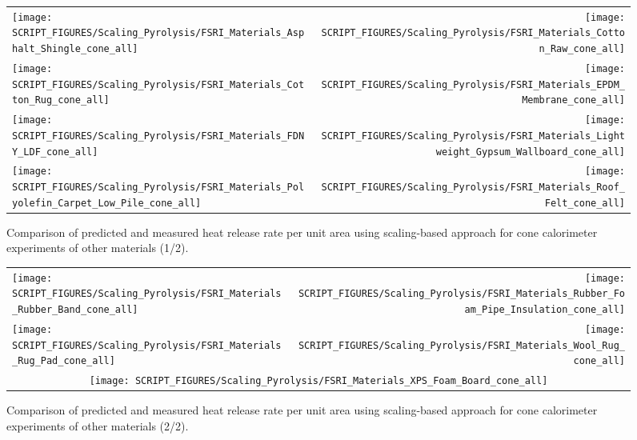 \begin{figure}[p]
\begin{tabular*}{\textwidth}{l@{\extracolsep{\fill}}r}
\texttt{[image: SCRIPT\_FIGURES/Scaling\_Pyrolysis/FSRI\_Materials\_Asphalt\_Shingle\_cone\_all]} &
\texttt{[image: SCRIPT\_FIGURES/Scaling\_Pyrolysis/FSRI\_Materials\_Cotton\_Raw\_cone\_all]} \\
\texttt{[image: SCRIPT\_FIGURES/Scaling\_Pyrolysis/FSRI\_Materials\_Cotton\_Rug\_cone\_all]} &
\texttt{[image: SCRIPT\_FIGURES/Scaling\_Pyrolysis/FSRI\_Materials\_EPDM\_Membrane\_cone\_all]} \\
\texttt{[image: SCRIPT\_FIGURES/Scaling\_Pyrolysis/FSRI\_Materials\_FDNY\_LDF\_cone\_all]} &
\texttt{[image: SCRIPT\_FIGURES/Scaling\_Pyrolysis/FSRI\_Materials\_Lightweight\_Gypsum\_Wallboard\_cone\_all]} \\
\texttt{[image: SCRIPT\_FIGURES/Scaling\_Pyrolysis/FSRI\_Materials\_Polyolefin\_Carpet\_Low\_Pile\_cone\_all]} &
\texttt{[image: SCRIPT\_FIGURES/Scaling\_Pyrolysis/FSRI\_Materials\_Roof\_Felt\_cone\_all]} \\
\end{tabular*}
\caption[HRRPUA of FSRI materials using scaling model, other materials]
{Comparison of predicted and measured heat release rate per unit area using scaling-based approach for cone calorimeter experiments of other materials (1/2).}
\label{FSRI_Materials_others1}
\end{figure}

\begin{figure}[p]
\begin{tabular*}{\textwidth}{l@{\extracolsep{\fill}}r}
\texttt{[image: SCRIPT\_FIGURES/Scaling\_Pyrolysis/FSRI\_Materials\_Rubber\_Band\_cone\_all]} &
\texttt{[image: SCRIPT\_FIGURES/Scaling\_Pyrolysis/FSRI\_Materials\_Rubber\_Foam\_Pipe\_Insulation\_cone\_all]} \\
\texttt{[image: SCRIPT\_FIGURES/Scaling\_Pyrolysis/FSRI\_Materials\_Rug\_Pad\_cone\_all]} &
\texttt{[image: SCRIPT\_FIGURES/Scaling\_Pyrolysis/FSRI\_Materials\_Wool\_Rug\_cone\_all]} \\
\multicolumn{2}{c}{\texttt{[image: SCRIPT\_FIGURES/Scaling\_Pyrolysis/FSRI\_Materials\_XPS\_Foam\_Board\_cone\_all]}}
\end{tabular*}
\caption[HRRPUA of FSRI materials using scaling model, other materials]
{Comparison of predicted and measured heat release rate per unit area using scaling-based approach for cone calorimeter experiments of other materials (2/2).}
\label{FSRI_Materials_others2}
\end{figure}

